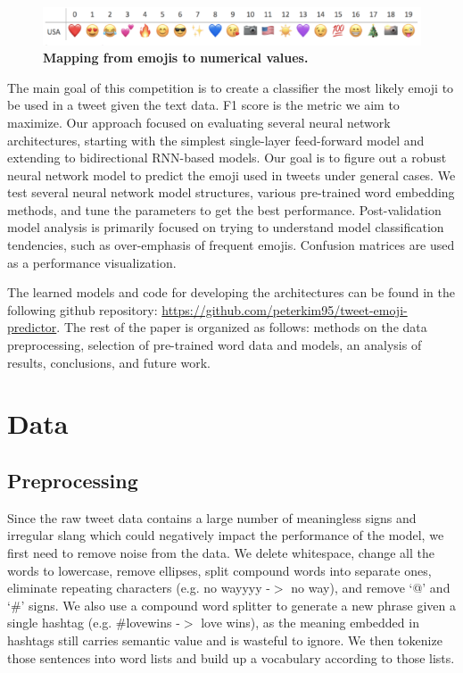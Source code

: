 \documentclass[11pt,a4paper]{article}
\begin{document}
	
	\begin{figure}[H]
		\centering\includegraphics[scale=0.36]{emojis} 
		\caption{\textbf{ Mapping from emojis to numerical values.}}
	\end{figure}
	
	
	The main goal of this competition is to create a classifier the most likely emoji to be used in a tweet given the text data. F1 score is the metric we aim to maximize. Our approach focused on evaluating several neural network architectures, starting with the simplest single-layer feed-forward model and extending to bidirectional RNN-based models. Our goal is to figure out a robust neural network model to predict the emoji used in tweets under general cases. We test several neural network model structures, various pre-trained word embedding methods, and tune the parameters to get the best performance. Post-validation model analysis is primarily focused on trying to understand model classification tendencies, such as over-emphasis of frequent emojis. Confusion matrices are used as a performance visualization. 
	\par
	The learned models and code for developing the architectures can be found in the following github repository: \url{https://github.com/peterkim95/tweet-emoji-predictor}.  The rest of the paper is organized as follows: methods on the data preprocessing, selection of pre-trained word data and models, an analysis of results, conclusions, and future work.
	
	\section{Data}
	\subsection{Preprocessing}
	Since the raw tweet data contains a large number of meaningless signs and irregular slang which could negatively impact the performance of the model, we first need to remove noise from the data. We delete whitespace, change all the words to lowercase, remove ellipses, split compound words into separate ones, eliminate repeating characters (e.g. no wayyyy -$>$ no way), and remove ‘@’ and ‘\#’ signs. We also use a compound word splitter to generate a new phrase given a single hashtag (e.g. \#lovewins -$>$ love wins), as the meaning embedded in hashtags still carries semantic value and is wasteful to ignore. We then tokenize those sentences into word lists and build up a vocabulary according to those lists.
	
\end{document}
